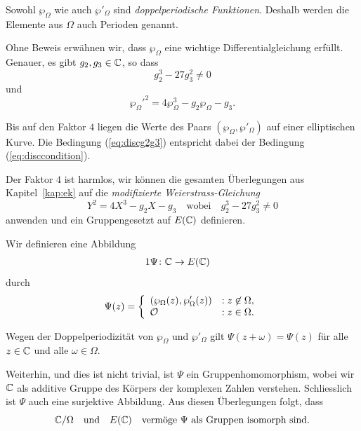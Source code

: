 \begin{bemerkung}
  Sowohl $\wp_\Omega$ wie auch $\wp'_\Omega$ sind \emph{doppelperiodische
    Funktionen}. Deshalb werden die Elemente aus $\Omega$ auch
  Perioden genannt. 
\end{bemerkung}

Ohne Beweis erwähnen wir, dass $\wp_\Omega$ eine wichtige
Differentialgleichung erfüllt. Genauer, es gibt $g_2,g_3\in{\mathbb{C}}$, so
dass
\begin{equation}
  \label{eq:discg2g3}
  g_2^3-27g_3^2 \not=0
\end{equation}
und 
\begin{equation}
  \label{eq:weierstrassdgl}
  {\wp_\Omega'}^2  = 4 \wp_\Omega^3 - g_2\wp_\Omega - g_3.  
\end{equation}


Bis auf den Faktor $4$ liegen die Werte des Paars
$(\wp_\Omega,\wp'_\Omega)$ auf einer elliptischen Kurve. 
Die Bedingung (\ref{eq:discg2g3}) entspricht dabei der Bedingung
(\ref{eq:disccondition}).

Der Faktor $4$ ist harmlos, wir können die gesamten Überlegungen aus
Kapitel~\ref{kap:ek} auf die \emph{modifizierte Weierstrass-Gleichung}
\begin{equation}
  \label{eq:modweierstrass}
  Y^2 = 4X^3-g_2X-g_3 \quad\text{wobei}\quad   g_2^3-27g_3^2 \not=0
\end{equation}
anwenden und ein Gruppengesetzt auf $E({\mathbb{C}})$ definieren.

Wir definieren eine Abbildung
\begin{alignat*}1
  \Psi \colon &\IC\rightarrow E(\IC)
\end{alignat*}
durch
\begin{equation*}
  \Psi(z) = \left\{
    \begin{array}{ll}
      (\wp_\Omega(z),\wp'_\Omega(z)) &: z\not\in\Omega, \\
      {\mathcal O} &:z\in \Omega.
    \end{array}\right.
\end{equation*}

Wegen der Doppelperiodizität von $\wp_\Omega$ und $\wp'_\Omega$
gilt $\Psi(z+\omega) = \Psi(z)$ für alle $z\in{\mathbb{C}}$ und alle
$\omega\in\Omega$.

Weiterhin, und dies ist nicht trivial, ist $\Psi$ ein
Gruppenhomomorphism, wobei wir ${\mathbb{C}}$ als additive Gruppe des Körpers
der komplexen Zahlen verstehen. Schliesslich ist $\Psi$ auch eine
surjektive Abbildung. Aus diesen Überlegungen folgt, dass
\begin{equation*}
  {\mathbb{C}}/\Omega \quad\text{und}\quad E({\mathbb{C}})\quad\text{vermöge $\Psi$ als Gruppen isomorph sind.}
\end{equation*}

